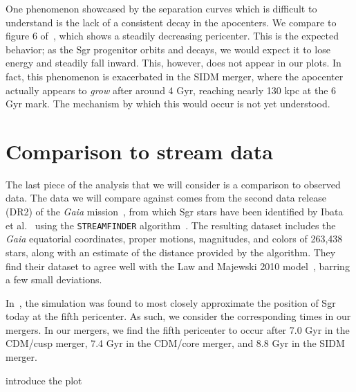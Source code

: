 One phenomenon showcased by the separation curves which is difficult to
understand is the lack of a consistent decay in the apocenters. We compare to
figure 6 of~\cite{dierickx_predicted_2017}, which shows a steadily decreasing
pericenter.  This is the expected behavior; as the Sgr progenitor orbits and
decays, we would expect it to lose energy and steadily fall inward.  This,
however, does not appear in our plots.  In fact, this phenomenon is
exacerbated in the SIDM merger, where the apocenter actually appears to
\textit{grow} after around 4 Gyr, reaching nearly 130 kpc at the 6 Gyr mark.
The mechanism by which this would occur is not yet understood.


\hypertarget{comparison-to-stream-data}{%
\section{Comparison to stream data}\label{comparison-to-stream-data}}

The last piece of the analysis that we will consider is a comparison to observed
data.  The data we will compare against comes from the second data release
(DR2) of the \textit{Gaia}
mission~\cite{lindegren_gaia_2018,gaia_collaboration_gaia_2018}, from which Sgr
stars have been identified by Ibata et al.~\cite{ibata_panoramic_2020} using the
\verb|STREAMFINDER|
algorithm~\cite{malhan_streamfinder_2018,malhan_ghostly_2018}. The resulting
dataset includes the \textit{Gaia} equatorial coordinates, proper motions,
magnitudes, and colors of 263,438 stars, along with an estimate of the distance
provided by the algorithm. They find their dataset to agree well with the Law
and Majewski 2010 model~\cite{law_sagittarius_2010}, barring a few small
deviations.

In~\cite{dierickx_predicted_2017}, the simulation was found to most closely
approximate the position of Sgr today at the fifth pericenter.  As such, we
consider the corresponding times in our mergers.  In our mergers, we find the
fifth pericenter to occur after 7.0 Gyr in the CDM/cusp merger, 7.4 Gyr in the
CDM/core merger, and 8.8 Gyr in the SIDM merger.

introduce the plot

